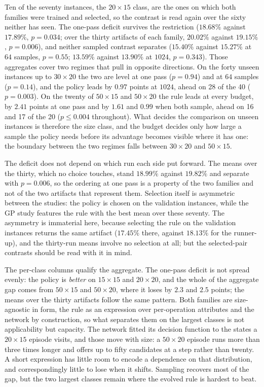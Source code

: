 \documentclass[preprint,12pt]{elsarticle}
\theoremstyle{definition}
\theoremstyle{remark}
\begin{document}
Ten of the seventy instances, the $20{\times}15$ class, are the ones
on which both families were trained and selected, so the contrast is
read again over the sixty neither has seen. The one-pass deficit
survives the restriction ($18.68\%$ against $17.89\%$, $p=0.034$; over
the thirty artifacts of each family, $20.02\%$ against $19.15\%$,
$p=0.006$), and neither sampled contrast separates ($15.40\%$ against
$15.27\%$ at $64$ samples, $p=0.55$; $13.59\%$ against $13.90\%$ at
$1024$, $p=0.343$). Those aggregates cover two regimes that pull in
opposite directions. On the forty unseen instances up to
$30{\times}20$ the two are level at one pass ($p=0.94$) and at $64$
samples ($p=0.14$), and the policy leads by $0.97$ points at $1024$,
ahead on 28 of the 40 ($p=0.003$). On the twenty of $50{\times}15$
and $50{\times}20$ the rule leads at every budget, by $2.41$ points at
one pass and by $1.61$ and $0.99$ when both sample, ahead on 16 and 17
of the 20 ($p\le0.004$ throughout). What decides the comparison on
unseen instances is therefore the size class, and the budget decides
only how large a sample the policy needs before its advantage becomes
visible where it has one: the boundary between the two regimes falls
between $30{\times}20$ and $50{\times}15$.

The deficit does not depend on which run each side put forward. The
means over the thirty, which no choice touches, stand $18.99\%$
against $19.82\%$ and separate with $p=0.006$, so the ordering at one
pass is a property of the two families and not of the two artifacts
that represent them. Selection itself is asymmetric between the
studies: the policy is chosen on the validation instances, while the
GP study features the rule with the best mean over these seventy. The
asymmetry is immaterial here, because selecting the rule on the
validation instances returns the same artifact ($17.45\%$ there,
against $18.13\%$ for the runner-up), and the thirty-run means
involve no selection at all; but the selected-pair contrasts should
be read with it in mind.

The per-class columns qualify the aggregate. The one-pass deficit is
not spread evenly: the policy is \emph{better} on $15{\times}15$
and $20{\times}20$, and the whole of the aggregate gap comes from
$50{\times}15$ and $50{\times}20$, where it loses by $2.3$ and $2.5$
points; the means over the thirty artifacts follow the same pattern.
Both families are size-agnostic in form, the rule as an expression
over per-operation attributes and the network by construction, so
what separates them on the largest classes is not applicability but
capacity. The network fitted its decision function to the states a
$20{\times}15$ episode visits, and those move with size: a
$50{\times}20$ episode runs more than three times longer and offers
up to fifty candidates at a step rather than twenty. A short
expression has little room to encode a dependence on that
distribution, and correspondingly little to lose when it shifts.
Sampling recovers most of the gap, but the two largest classes remain
where the evolved rule is hardest to beat.
\end{document}
